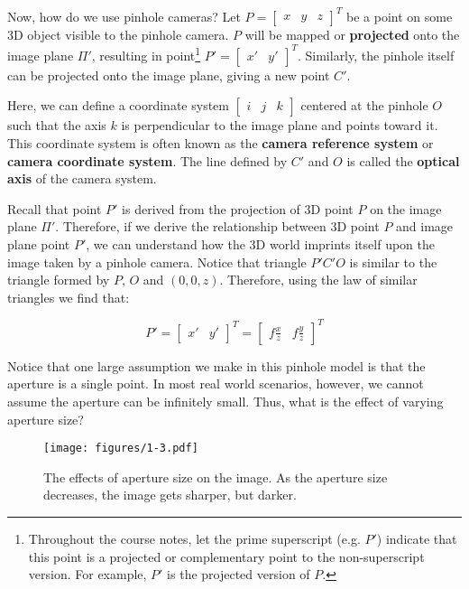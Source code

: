 \documentclass[a4paper, 12pt]{article}
\renewcommand\emph{\textbf}
\begin{document}
Now, how do we use pinhole cameras? Let $P = \begin{bmatrix}x & y & z\end{bmatrix}^T$ be a point on some 3D object visible to the pinhole camera. $P$ will be mapped or \textbf{projected} onto the image plane $\Pi'$, resulting in point\footnote{Throughout the course notes, let the prime superscript (e.g. $P'$) indicate that this point is a projected or complementary point to the non-superscript version. For example, $P'$ is the projected version of $P$.} $P' = \begin{bmatrix}x' & y'\end{bmatrix}^T$. Similarly, the pinhole itself can be projected onto the image plane, giving a new point $C'$. 

Here, we can define a coordinate system $\begin{bmatrix}i & j & k\end{bmatrix}$ centered at the pinhole $O$ such that the axis $k$ is perpendicular to the image plane and points toward it. This coordinate system is often known as the \emph{camera reference system} or \emph{camera coordinate system}. The line defined by $C'$ and $O$ is called the \emph{optical axis} of the camera system.

Recall that point $P'$ is derived from the projection of 3D point $P$ on the image plane $\Pi'$. Therefore, if we derive the relationship between 3D point $P$ and image plane point $P'$, we can understand how the 3D world imprints itself upon the image taken by a pinhole camera. Notice that triangle $P'C'O$ is similar to the triangle formed by $P$, $O$ and $(0,0,z)$. Therefore, using the law of similar triangles we find that:

\begin{equation}
    P' = \begin{bmatrix}x'&y'\end{bmatrix}^T = \begin{bmatrix}f\frac{x}{z} & f\frac{y}{z}\end{bmatrix}^T
\end{equation}

Notice that one large assumption we make in this pinhole model is that the aperture is a single point. In most real world scenarios, however, we cannot assume the aperture can be infinitely small. Thus, what is the effect of varying aperture size? 

\begin{figure}[h!]
\centering
\texttt{[image: figures/1-3.pdf]}
\caption{The effects of aperture size on the image. As the aperture size decreases, the image gets sharper, but darker.}
\label{fig:apertureSize}
\end{figure}
\end{document}
